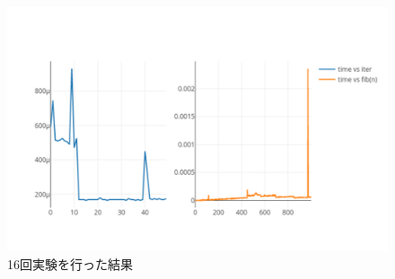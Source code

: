 \documentclass[onecolumn]{preport}
\begin{document}
\begin{figure}[H]
\begin{center}
\begin{minipage}{0.23\columnwidth}
      \subcaption{}
    \end{minipage}
    \begin{minipage}{0.23\columnwidth}   
      \includegraphics[width=\columnwidth]{figs/newplot16.pdf}
      \subcaption{}
    \end{minipage}
  \end{center}
  \caption{16回実験を行った結果}
  \label{figure:16}
\end{figure}




\end{document}
